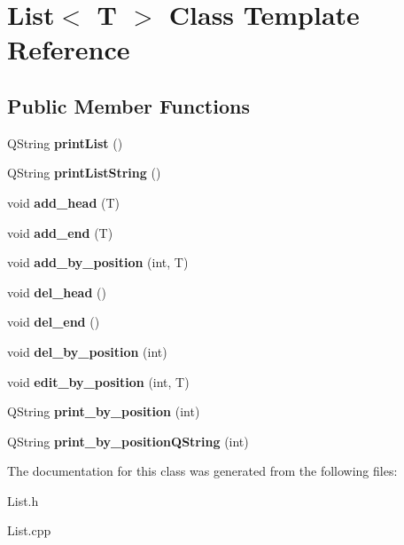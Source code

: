 \hypertarget{classList}{}\section{List$<$ T $>$ Class Template Reference}
\label{classList}
\subsection*{Public Member Functions}
\begin{DoxyCompactItemize}
\item 
\mbox{\label{classList_a0ddad18bce52e83ad87ded9e7afcda16}} 
Q\+String {\bfseries print\+List} ()
\item 
\mbox{\label{classList_aff7e979c134b2d2f34c0acaeae43bcd0}} 
Q\+String {\bfseries print\+List\+String} ()
\item 
\mbox{\label{classList_aeadbaee217ddbdfc8384dc8d3ca999f7}} 
void {\bfseries add\+\_\+head} (T)
\item 
\mbox{\label{classList_aeb2ac8746ee182f3d712bcdb01a83232}} 
void {\bfseries add\+\_\+end} (T)
\item 
\mbox{\label{classList_a5c73a4328b696bba11a0c728c7d726d1}} 
void {\bfseries add\+\_\+by\+\_\+position} (int, T)
\item 
\mbox{\label{classList_acb6b6d9b48bef482803b0860dc44971a}} 
void {\bfseries del\+\_\+head} ()
\item 
\mbox{\label{classList_a6a97729398d107e4ea6bd8ac8721eac0}} 
void {\bfseries del\+\_\+end} ()
\item 
\mbox{\label{classList_a82abfa6a5427d18e13160165e8230e7a}} 
void {\bfseries del\+\_\+by\+\_\+position} (int)
\item 
\mbox{\label{classList_a24d35c1c264c1d1ef216a290434c7900}} 
void {\bfseries edit\+\_\+by\+\_\+position} (int, T)
\item 
\mbox{\label{classList_a03cd37ba63b545efdb601675a5ca70a4}} 
Q\+String {\bfseries print\+\_\+by\+\_\+position} (int)
\item 
\mbox{\label{classList_aed6a145af233995c9af65e767d983f57}} 
Q\+String {\bfseries print\+\_\+by\+\_\+position\+Q\+String} (int)
\end{DoxyCompactItemize}


The documentation for this class was generated from the following files\+:\begin{DoxyCompactItemize}
\item 
List.\+h\item 
List.\+cpp\end{DoxyCompactItemize}
